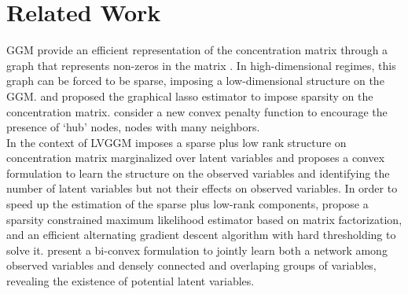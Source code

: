 \section{Related Work}
\label{related}
GGM provide an efficient representation of the concentration matrix through a graph that represents non-zeros in the matrix \citep{lauritzen1996graphical}. In high-dimensional regimes, this graph can be forced to be sparse, imposing a low-dimensional structure on the GGM. \citet{yuan2007model} and \citet{banerjee2008model} proposed the graphical lasso estimator to impose sparsity on the concentration matrix. \citet{tan2014learning} consider a new convex penalty function to encourage the presence of ‘hub’ nodes, nodes with many neighbors.\\
In the context of LVGGM \citet{chandrasekaran2010} imposes a sparse plus low rank structure on concentration matrix marginalized over latent variables and proposes a convex formulation to learn the structure on the observed variables and identifying the number of latent variables but not their effects on observed variables. In order to speed
up the estimation of the sparse plus low-rank components,\citet{xu2017speeding} propose a sparsity constrained maximum likelihood estimator based on matrix factorization, and an efficient alternating gradient descent algorithm with hard thresholding to solve it. \citet{hosseini2016learning}  present a bi-convex formulation to jointly learn both a network among observed variables and densely connected and overlaping groups of variables, revealing the existence of potential latent variables. 
%

%
%
%
